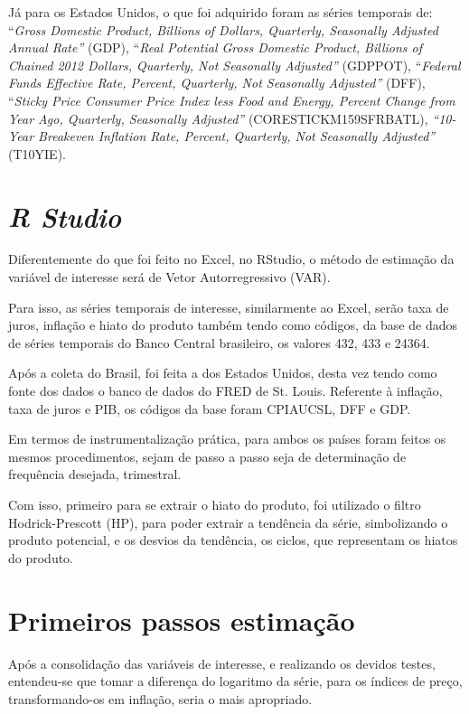  J\'{a} para os Estados Unidos, o que foi adquirido foram as s\'{e}ries temporais de: ``\textit{Gross Domestic Product, Billions of Dollars, Quarterly, Seasonally Adjusted Annual Rate'' }(GDP), ``\textit{Real Potential Gross Domestic Product, Billions of Chained 2012 Dollars, Quarterly, Not Seasonally Adjusted'' }(GDPPOT), ``\textit{Federal Funds Effective Rate, Percent, Quarterly, Not Seasonally Adjusted''} (DFF), ``\textit{Sticky Price Consumer Price Index less Food and Energy, Percent Change from Year Ago, Quarterly, Seasonally Adjusted'' }(CORESTICKM159SFRBATL), \textit{``10-Year Breakeven Inflation Rate, Percent, Quarterly, Not Seasonally Adjusted''} (T10YIE). 

\section*{\textit{R Studio}}

 Diferentemente do que foi feito no Excel, no RStudio, o m\'{e}todo de estima\c{c}\~{a}o da vari\'{a}vel de interesse ser\'{a} de Vetor Autorregressivo (VAR).

 Para isso, as s\'{e}ries temporais de interesse, similarmente ao Excel, ser\~{a}o taxa de juros, infla\c{c}\~{a}o e hiato do produto tamb\'{e}m tendo como c\'{o}digos, da base de dados de s\'{e}ries temporais do Banco Central brasileiro, os valores 432, 433 e 24364. 

 Ap\'{o}s a coleta do Brasil, foi feita a dos Estados Unidos, desta vez tendo como fonte dos dados o banco de dados do FRED de St. Louis. Referente \`{a} infla\c{c}\~{a}o, taxa de juros e PIB, os c\'{o}digos da base foram CPIAUCSL, DFF e GDP.

 Em termos de instrumentaliza\c{c}\~{a}o pr\'{a}tica, para ambos os pa\'{i}ses foram feitos os mesmos procedimentos, sejam de passo a passo seja de determina\c{c}\~{a}o de frequ\^{e}ncia desejada, trimestral. 


 Com isso, primeiro para se extrair o hiato do produto, foi utilizado o filtro Hodrick-Prescott (HP), para poder extrair a tend\^{e}ncia da s\'{e}rie, simbolizando o produto potencial, e os desvios da tend\^{e}ncia, os ciclos, que representam os hiatos do produto. 

\section*{Primeiros passos estima\c{c}\~{a}o}

\textit{ }Ap\'{o}s a consolida\c{c}\~{a}o das vari\'{a}veis de interesse, e realizando os devidos testes, entendeu-se que tomar a diferen\c{c}a do logaritmo da s\'{e}rie, para os \'{i}ndices de pre\c{c}o, transformando-os em infla\c{c}\~{a}o, seria o mais apropriado. 

